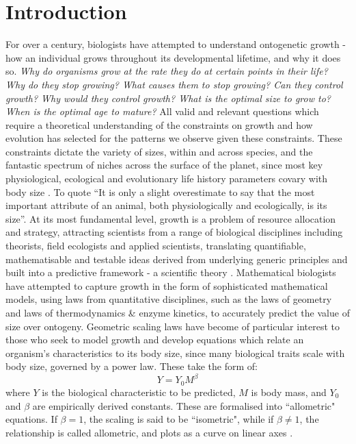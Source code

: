 \documentclass[a4paper]{article} %
\begin{document}
\section{Introduction}\thispagestyle{empty}
    For over a century, biologists have attempted to understand ontogenetic growth - how an individual grows throughout its developmental lifetime, and why it does so. \textit{Why do organisms grow at the rate they do at certain points in their life? Why do they stop growing? What causes them to stop growing? Can they control growth? Why would they control growth? What is the optimal size to grow to? When is the optimal age to mature?} All valid and relevant questions which require a theoretical understanding of the constraints on growth and how evolution has selected for the patterns we observe given these constraints. These constraints dictate the variety of sizes, within and across species, and the fantastic spectrum of niches across the surface of the planet, since most key physiological, ecological and evolutionary life history parameters covary with body size \autocite{peters1983, brown2000-scaling-book,schmidt1984scaling,Marshall2019b}. To quote \cite{Bartholomew1981} ``It is only a slight overestimate to say that the most important attribute of an animal, both physiologically and ecologically, is its size''. At its most fundamental level, growth is a problem of resource allocation and strategy, attracting scientists from a range of biological disciplines including theorists, field ecologists and applied scientists, translating quantifiable, mathematisable and testable ideas derived from underlying generic principles and built into a predictive framework - a scientific theory \autocite{popper1962,popper1972,peters1983, West2011}. Mathematical biologists have attempted to capture growth in the form of sophisticated mathematical models, using laws from quantitative disciplines, such as the laws of geometry and laws of thermodynamics \& enzyme kinetics, to accurately predict the value of size over ontogeny. Geometric scaling laws have become of particular interest to those who seek to model growth and develop equations which relate an organism's characteristics to its body size, since many biological traits scale with body size, governed by a power law. These take the form of:
        \begin{equation*}
            Y = Y_0 M^{\beta}
        \end{equation*}
    where $Y$ is the biological characteristic to be predicted, $M$ is body mass, and $Y_0$ and $\beta$ are empirically derived constants. These are formalised into ``allometric" equations. If $\beta = 1$, the scaling is said to be ``isometric", while if $\beta \neq 1$, the relationship is called allometric, and plots as a curve on linear axes \autocite{brown2000-scaling-book}.
\end{document}
